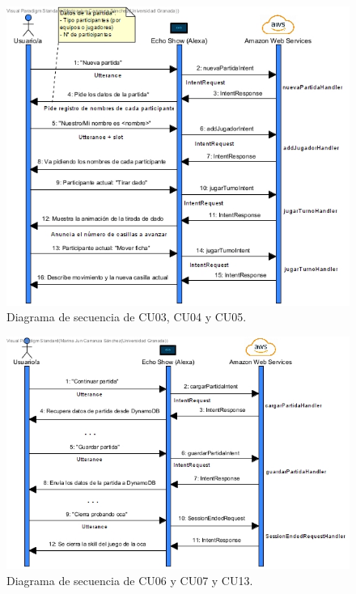 \begin{figure}[H]
	\centering
	\includegraphics[width=1\textwidth]{imgs/DS02.jpg}
	\caption{Diagrama de secuencia de CU03, CU04 y CU05.}
	\label{fig:DS02}
\end{figure}

\begin{figure}[H]
	\centering
	\includegraphics[width=1\textwidth]{imgs/DS03.jpg}
	\caption{Diagrama de secuencia de CU06 y CU07 y CU13.}
	\label{fig:DS03}
\end{figure}

